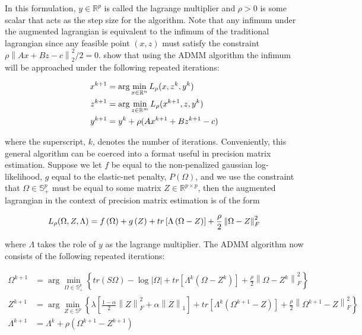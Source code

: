 \documentclass[11pt,]{report}
\theoremstyle{definition}
\theoremstyle{definition}
\theoremstyle{definition}
\theoremstyle{remark}
\begin{document}
In this formulation, \(y \in \mathbb{R}^{p}\) is called the lagrange multiplier and \(\rho > 0\) is some scalar that acts as the step size for the algorithm. Note that any infimum under the augmented lagrangian is equivalent to the infimum of the traditional lagrangian since any feasible point \((x, z)\) must satisfy the constraint \(\rho\left\| Ax + Bz - c \right\|_{2}^{2}/2 = 0\). \citet{boyd2011distributed} show that using the ADMM algorithm the infimum will be approached under the following repeated iterations:

\begin{equation}
\begin{split}
  x^{k + 1} &= \arg\min_{x \in \mathbb{R}^{n}}L_{\rho}(x, z^{k}, y^{k}) \\
  z^{k + 1} &= \arg\min_{z \in \mathbb{R}^{m}}L_{\rho}(x^{k + 1}, z, y^{k}) \\
  y^{k + 1} &= y^{k} + \rho(Ax^{k + 1} + Bz^{k + 1} - c)
\end{split}  
\label{eq:admmalgo}\notag
\end{equation}

where the superscript, \(k\), denotes the number of iterations. Conveniently, this general algorithm can be coerced into a format useful in precision matrix estimation. Suppose we let \(f\) be equal to the non-penalized gaussian log-likelihood, \(g\) equal to the elastic-net penalty, \(P\left( \Omega \right)\), and we use the constraint that \(\Omega \in \mathbb{S}_{+}^{p}\) must be equal to some matrix \(Z \in \mathbb{R}^{p \times p}\), then the augmented lagrangian in the context of precision matrix estimation is of the form

\begin{equation}
L_{\rho}(\Omega, Z, \Lambda) = f\left(\Omega\right) + g\left(Z\right) + tr\left[\Lambda\left(\Omega - Z\right)\right] + \frac{\rho}{2}\left\|\Omega - Z\right\|_{F}^{2}
\label{eq:auglagrange2}\notag
\end{equation}

where \(\Lambda\) takes the role of \(y\) as the lagrange multiplier. The ADMM algorithm now consists of the following repeated iterations:

\begin{equation}
\begin{split}
  \Omega^{k + 1} &= \arg\min_{\Omega \in \mathbb{S}_{+}^{p}}\left\{ tr\left(S\Omega\right) - \log\left|\Omega\right| + tr\left[\Lambda^{k}\left(\Omega - Z^{k}\right)\right] + \frac{\rho}{2}\left\| \Omega - Z^{k} \right\|_{F}^{2} \right\} \\
  Z^{k + 1} &= \arg\min_{Z \in \mathbb{S}^{p}}\left\{ \lambda\left[ \frac{1 - \alpha}{2}\left\| Z \right\|_{F}^{2} + \alpha\left\| Z \right\|_{1} \right] + tr\left[\Lambda^{k}\left(\Omega^{k + 1} - Z\right)\right] + \frac{\rho}{2}\left\| \Omega^{k + 1} - Z \right\|_{F}^{2} \right\} \\
  \Lambda^{k + 1} &= \Lambda^{k} + \rho\left( \Omega^{k + 1} - Z^{k + 1} \right)
\label{eq:ADMMorig}
\end{split}
\end{equation}
\end{document}
